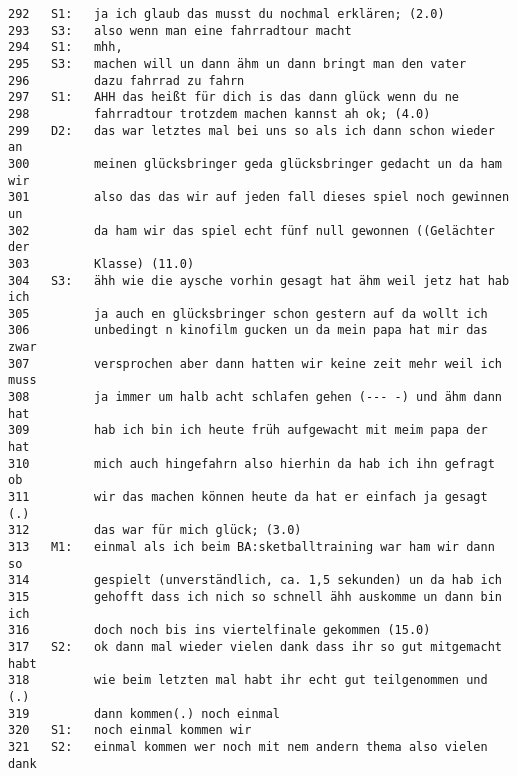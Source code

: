 \begin{lstlisting}[language={}]
292   S1:   ja ich glaub das musst du nochmal erklären; (2.0)
293   S3:   also wenn man eine fahrradtour macht
294   S1:   mhh,
295   S3:   machen will un dann ähm un dann bringt man den vater        
296         dazu fahrrad zu fahrn
297   S1:   AHH das heißt für dich is das dann glück wenn du ne 
298         fahrradtour trotzdem machen kannst ah ok; (4.0)
299   D2:   das war letztes mal bei uns so als ich dann schon wieder an 
300         meinen glücksbringer geda glücksbringer gedacht un da ham wir 
301         also das das wir auf jeden fall dieses spiel noch gewinnen un 
302         da ham wir das spiel echt fünf null gewonnen ((Gelächter der 
303         Klasse) (11.0)
304   S3:   ähh wie die aysche vorhin gesagt hat ähm weil jetz hat hab ich  
305         ja auch en glücksbringer schon gestern auf da wollt ich 
306         unbedingt n kinofilm gucken un da mein papa hat mir das zwar 
307         versprochen aber dann hatten wir keine zeit mehr weil ich muss 
308         ja immer um halb acht schlafen gehen (--- -) und ähm dann hat 
309         hab ich bin ich heute früh aufgewacht mit meim papa der hat 
310         mich auch hingefahrn also hierhin da hab ich ihn gefragt ob 
311         wir das machen können heute da hat er einfach ja gesagt (.) 
312         das war für mich glück; (3.0)
313   M1:   einmal als ich beim BA:sketballtraining war ham wir dann so 
314         gespielt (unverständlich, ca. 1,5 sekunden) un da hab ich 
315         gehofft dass ich nich so schnell ähh auskomme un dann bin ich 
316         doch noch bis ins viertelfinale gekommen (15.0)
317   S2:   ok dann mal wieder vielen dank dass ihr so gut mitgemacht habt 
318         wie beim letzten mal habt ihr echt gut teilgenommen und (.) 
319         dann kommen(.) noch einmal
320   S1:   noch einmal kommen wir 
321   S2:   einmal kommen wer noch mit nem andern thema also vielen dank
\end{lstlisting}
